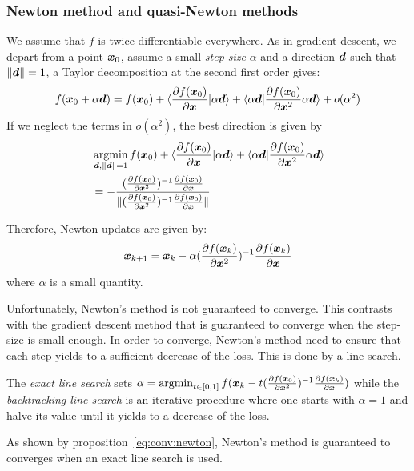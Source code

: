 \subsubsection{Newton method and quasi-Newton methods}
We assume that $f$ is twice differentiable everywhere.
As in gradient descent, we depart from a point $\xb_0$, assume a small \emph{step size} $\alpha$ and a direction
$\db$ such that $\|\db\| = 1$, a Taylor decomposition at the second first order gives:
\begin{align}
  f(\xb_0 + \alpha \db) = f(\xb_0) + \langle \partialfrac{\xb}{f(\xb_0)} | \alpha \db \rangle + \langle \alpha \db | \partialfrac{\xb^2}{f(\xb_0)} \alpha \db \rangle + o(\alpha^2) 
\end{align}
If we neglect the terms in $o(\alpha^2)$, the best direction is given by
\begin{align}
  &\argmin_{\db, \|\db\| = 1} f(\xb_0) + \langle \partialfrac{\xb}{f(\xb_0)} | \alpha \db \rangle + \langle \alpha \db | \partialfrac{\xb^2}{f(\xb_0)} \alpha \db \rangle \\
  &= - \frac{(\partialfrac{\xb^2}{f(\xb_0)})^{-1}\partialfrac{\xb}{f(\xb_0)}}{\| (\partialfrac{\xb^2}{f(\xb_0)})^{-1} \partialfrac{\xb}{f(\xb_0)}\|}
\end{align}


Therefore, Newton updates are given by:
\begin{align}
  \xb_{k+1} = \xb_k -\alpha (\partialfrac{\xb^2}{f(\xb_k)})^{-1} \partialfrac{\xb}{f(\xb_k)} \label{eq:update:newton}
\end{align}
where $\alpha$ is a small quantity.

Unfortunately, Newton's method is not guaranteed to converge. This contrasts with the gradient descent method that is guaranteed to converge when the step-size is small enough.
In order to converge, Newton's method need to ensure that each step yields to a sufficient decrease of the loss. This is done by a line search.

The \emph{exact line search} sets $\alpha = \argmin_{t \in [0, 1]} f(\xb_k - t
(\partialfrac{\xb^2}{f(\xb_0)})^{-1} \partialfrac{\xb}{f(\xb_k)})$ while the \emph{backtracking line search} is an iterative procedure where one starts with $\alpha=1$ and halve its value until it yields to a decrease of the loss.

As shown by proposition~\ref{eq:conv:newton}, Newton's method is guaranteed to converges when an
exact line search is used.

